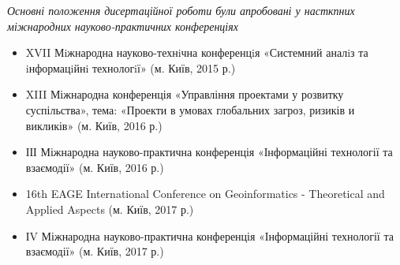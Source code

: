 \begin{center}
	\textit{Основні положення дисертаційної роботи були апробовані у насткпних міжнародних науково-практичних конференціях}
\end{center}

\begin{itemize}
	\item XVII Мiжнародна науково-технiчна конференцiя «Системний аналiз та iнформацiйнi технологiї» (м. Київ, 2015 р.)
	\item XIII Міжнародна конференція «Управління проектами у розвитку суспільства», тема: «Проекти в умовах глобальних загроз, ризиків и викликів» (м. Київ, 2016 р.)
	\item ІІІ Міжнародна науково-практична конференція «Інформаційні технології та взаємодії» (м. Київ, 2016 р.)
	\item 16th EAGE International Conference on Geoinformatics - Theoretical and Applied Aspects (м. Київ, 2017 р.)
	\item ІV Міжнародна науково-практична конференція «Інформаційні технології та взаємодії» (м. Київ, 2017 р.)
\end{itemize}
